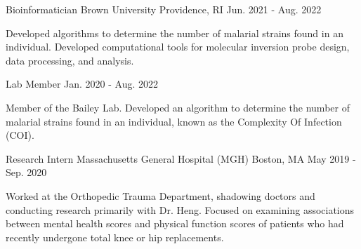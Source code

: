 
\begin{cventries}

\vspace{-0.5mm}
  \cventry
    {Bioinformatician} %
    {Brown University} %
    {Providence, RI} %
    {Jun. 2021 - Aug. 2022} %
    {
      \begin{cvitems} %
        \item {Developed algorithms to determine the number of malarial strains found in an individual. Developed computational tools for molecular inversion probe design, data processing, and analysis.}
      \end{cvitems}
    }

\vspace{-1mm}

\cventry
    {Lab Member} %
    {} %
    {} %
    {Jan. 2020 - Aug. 2022} %
    {
      \begin{cvitems} %
        \item {Member of the Bailey Lab. Developed an algorithm to determine the number of malarial strains found in an individual, known as the Complexity Of Infection (COI).}
      \end{cvitems}
    }

\vspace{-1mm}
  \cventry
    {Research Intern} %
    {Massachusetts General Hospital (MGH)} %
    {Boston, MA} %
    {May 2019 - Sep. 2020} %
    {
      \begin{cvitems} %
        \item {Worked at the Orthopedic Trauma Department, shadowing doctors and conducting research primarily with Dr. Heng. Focused on examining associations between mental health scores and physical function scores of patients who had recently undergone total knee or hip replacements.}
      \end{cvitems}
    }


\end{cventries}

